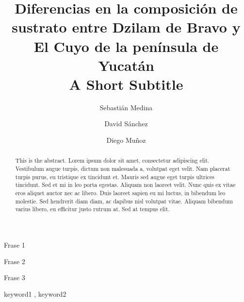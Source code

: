 \documentclass[
  authoryear,
  preprint,
  3p,
  twocolumn]{elsarticle}
\begin{document}
\begin{frontmatter}
\title{Diferencias en la composición de sustrato entre Dzilam de Bravo y
El Cuyo de la península de Yucatán \\\large{A Short Subtitle} }
\author[1]{Sebastián Medina%
%
}
\author[1]{David Sánchez%
%
}
\author[1]{Diego Muñoz%
%
}


        
\begin{abstract}
This is the abstract. Lorem ipsum dolor sit amet, consectetur adipiscing
elit. Vestibulum augue turpis, dictum non malesuada a, volutpat eget
velit. Nam placerat turpis purus, eu tristique ex tincidunt et. Mauris
sed augue eget turpis ultrices tincidunt. Sed et mi in leo porta
egestas. Aliquam non laoreet velit. Nunc quis ex vitae eros aliquet
auctor nec ac libero. Duis laoreet sapien eu mi luctus, in bibendum leo
molestie. Sed hendrerit diam diam, ac dapibus nisl volutpat vitae.
Aliquam bibendum varius libero, eu efficitur justo rutrum at. Sed at
tempus elit.
\end{abstract}



\begin{highlights}
\item Frase 1\item Frase 2\item Frase 3
\end{highlights}


\begin{keyword}
    keyword1 \sep 
    keyword2
\end{keyword}
\end{frontmatter}
    \ifdefined\Shaded\renewenvironment{Shaded}{\begin{tcolorbox}[interior hidden, enhanced, frame hidden, boxrule=0pt, sharp corners, borderline west={3pt}{0pt}{shadecolor}, breakable]}{\end{tcolorbox}}\fi
\end{document}

